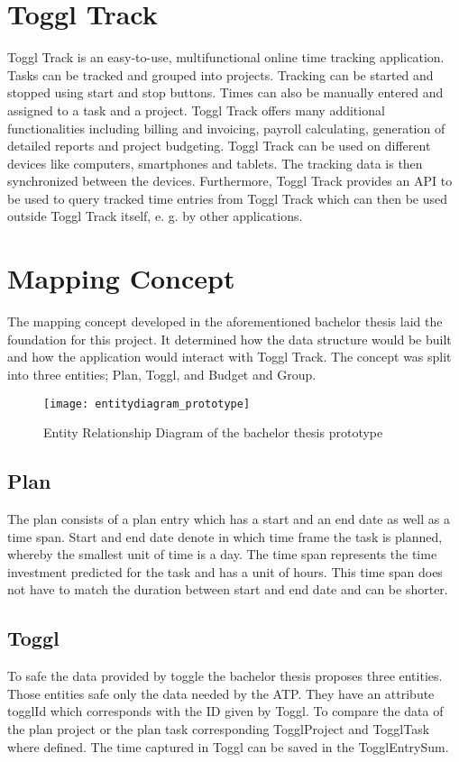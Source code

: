 \section{Toggl Track}
Toggl Track is an easy-to-use, multifunctional online time tracking application. Tasks can be tracked and grouped
into projects. Tracking can be started and stopped using start and stop buttons. Times can also be manually entered
and assigned to a task and a project. Toggl Track offers many additional functionalities including billing and invoicing,
payroll calculating, generation of detailed reports and project budgeting. Toggl Track can be used on different devices 
like computers, smartphones and tablets. The tracking data is then synchronized between the devices. Furthermore, Toggl 
Track provides an API to be used to query tracked time entries from Toggl Track which can then be used outside Toggl Track 
itself, e. g. by other applications. \cite{bachelorarbeit_Egger_Verstappen_page8} \cite{toggl_track_url}

\section{Mapping Concept}
The mapping concept developed in the aforementioned bachelor thesis \cite{bachelorarbeit_Egger_Verstappen_page20-22} laid the foundation for this project. It determined how the data structure would be built and how the application would interact with Toggl Track. The concept was split into three entities; Plan, Toggl, and Budget and Group. 

\begin{figure}[H]
	\centering
	\texttt{[image: entitydiagram\_prototype]}
	\caption{Entity Relationship Diagram of the bachelor thesis prototype}
	\label{figure2}
\end{figure}

\subsection{Plan}
The plan consists of a plan entry which has a start and an end date as well as a time span. Start and end date denote in which time frame the task is planned, whereby the smallest unit of time is a day. The time span represents the time investment predicted for the task and has a unit of hours. This time span does not have to match the duration between start and end date and can be shorter.
\subsection{Toggl}
To safe the data provided by toggle the bachelor thesis proposes three entities. Those entities safe only the data needed by the ATP. They have an attribute togglId which corresponds with the ID given by Toggl. To compare the data of the plan project or the plan task corresponding TogglProject and TogglTask where defined. The time captured in Toggl can be saved in the TogglEntrySum.

